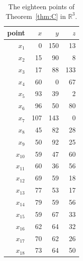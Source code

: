\begin{table}[tb]
\caption{The eighteen points of Theorem~\ref{thm:C} in $\mathbb{R}^3$.}\label{tab:coordsCthree}
\begin{ruledtabular}
\begin{tabular}{rrrr}
point & $x$ & $y$ & $z$ \\ \hline
$x_{1}$ & 0 & 150 & 13 \\
$x_{2}$ & 15 & 90 & 8 \\
$x_{3}$ & 17 & 88 & 133 \\
$x_{4}$ & 60 & 0 & 67 \\
$x_{5}$ & 93 & 39 & 2 \\
$x_{6}$ & 96 & 50 & 80 \\
$x_{7}$ & 107 & 143 & 0 \\
$x_{8}$ & 45 & 82 & 28 \\
$x_{9}$ & 50 & 92 & 25 \\
$x_{10}$ & 59 & 47 & 60 \\
$x_{11}$ & 60 & 36 & 56 \\
$x_{12}$ & 69 & 59 & 18 \\
$x_{13}$ & 77 & 53 & 17 \\
$x_{14}$ & 79 & 59 & 56 \\
$x_{15}$ & 59 & 67 & 33 \\
$x_{16}$ & 62 & 64 & 32 \\
$x_{17}$ & 70 & 62 & 26 \\
$x_{18}$ & 73 & 64 & 50 \\
\end{tabular}
\end{ruledtabular}
\end{table}
